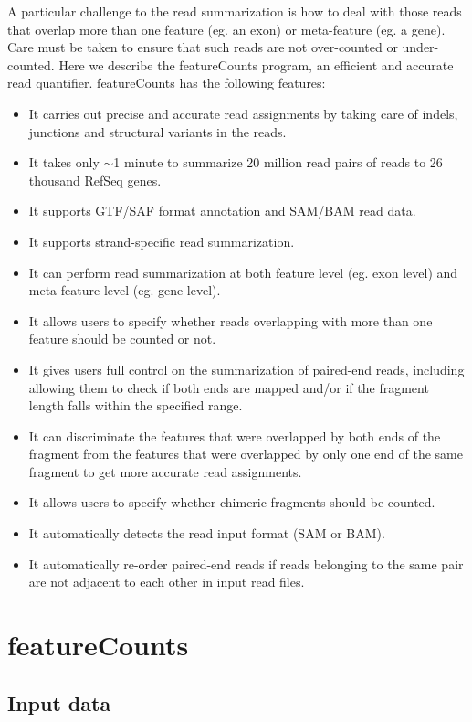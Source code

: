 \documentclass[12pt]{report}
\newcommand{\featureCounts}{\textsf{featureCounts}}
\begin{document}
A particular challenge to the read summarization is how to deal with those reads that overlap more than one feature (eg. an exon) or meta-feature (eg. a gene).
Care must be taken to ensure that such reads are not over-counted or under-counted.
Here we describe the {\featureCounts} program, an efficient and accurate read quantifier.
{\featureCounts} has the following features:
\begin{itemize}
\item It carries out precise and accurate read assignments by taking care of indels, junctions and structural variants in the reads.
\item It takes only $\sim$1 minute to summarize 20 million read pairs of reads to 26 thousand RefSeq genes.
\item It supports GTF/SAF format annotation and SAM/BAM read data.
\item It supports strand-specific read summarization.
\item It can perform read summarization at both feature level (eg. exon level) and meta-feature level (eg. gene level).
\item It allows users to specify whether reads overlapping with more than one feature should be counted or not.
\item It gives users full control on the summarization of paired-end reads, including allowing them to check if both ends are mapped and/or if the fragment length falls within the specified range.
\item It can discriminate the features that were overlapped by both ends of the fragment from the features that were overlapped by only one end of the same fragment to get more accurate read assignments.
\item It allows users to specify whether chimeric fragments should be counted.
\item It automatically detects the read input format (SAM or BAM).
\item It automatically re-order paired-end reads if reads belonging to the same pair are not adjacent to each other in input read files.
\end{itemize}

\section{featureCounts}
\label{sec:featureCounts}

\subsection{Input data}
\end{document}
